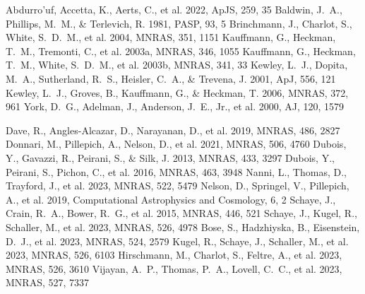 \documentclass[twocolumn]{aastex631}
\begin{document}
\begin{thebibliography}{}
 Abdurro'uf, Accetta, K., Aerts, C., et al. 2022, ApJS, 259, 35
 Baldwin, J.~A., Phillips, M.~M., \& Terlevich, R. 1981, PASP, 93, 5
 Brinchmann, J., Charlot, S., White, S.~D.~M., et al. 2004, MNRAS, 351, 1151
 Kauffmann, G., Heckman, T.~M., Tremonti, C., et al. 2003a, MNRAS, 346, 1055
 Kauffmann, G., Heckman, T.~M., White, S.~D.~M., et al. 2003b, MNRAS, 341, 33
 Kewley, L.~J., Dopita, M.~A., Sutherland, R.~S., Heisler, C.~A., \& Trevena, J. 2001, ApJ, 556, 121
 Kewley, L.~J., Groves, B., Kauffmann, G., \& Heckman, T. 2006, MNRAS, 372, 961
 York, D.~G., Adelman, J., Anderson, J.~E., Jr., et al. 2000, AJ, 120, 1579

 Dave, R., Angles-Alcazar, D., Narayanan, D., et al. 2019, MNRAS, 486, 2827
 Donnari, M., Pillepich, A., Nelson, D., et al. 2021, MNRAS, 506, 4760
 Dubois, Y., Gavazzi, R., Peirani, S., \& Silk, J. 2013, MNRAS, 433, 3297
 Dubois, Y., Peirani, S., Pichon, C., et al. 2016, MNRAS, 463, 3948
 Nanni, L., Thomas, D., Trayford, J., et al. 2023, MNRAS, 522, 5479
 Nelson, D., Springel, V., Pillepich, A., et al. 2019, Computational Astrophysics and Cosmology, 6, 2
 Schaye, J., Crain, R.~A., Bower, R.~G., et al. 2015, MNRAS, 446, 521
 Schaye, J., Kugel, R., Schaller, M., et al. 2023, MNRAS, 526, 4978
 Bose, S., Hadzhiyska, B., Eisenstein, D.~J., et al. 2023, MNRAS, 524, 2579
 Kugel, R., Schaye, J., Schaller, M., et al. 2023, MNRAS, 526, 6103
 Hirschmann, M., Charlot, S., Feltre, A., et al. 2023, MNRAS, 526, 3610
 Vijayan, A.~P., Thomas, P.~A., Lovell, C.~C., et al. 2023, MNRAS, 527, 7337
\end{thebibliography}
\end{document}

